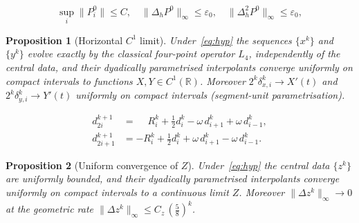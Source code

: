 \documentclass[10pt,a4paper]{amsart}
\newtheorem{proposition}{Proposition}
\newcommand{\Dh}{\Delta_h}
\newcommand{\Dhh}{\Delta_h^2}
\newcommand{\Lop}{L_4}
\newcommand{\R}{\mathbb{R}}
\newcommand{\norm}[1]{\lVert #1 \rVert}
\begin{document}
\begin{equation}\label{eq:hyp}
  \sup_i\norm{P_i^0}\leq C,\quad
  \norm{\Dh P^0}_\infty\leq\varepsilon_0,\quad
  \norm{\Dhh P^0}_\infty\leq\varepsilon_0,
\end{equation}

\begin{proposition}[Horizontal $C^1$ limit]\label{prop:horizontal}
Under~\eqref{eq:hyp} the sequences $\{x^k\}$ and $\{y^k\}$ evolve exactly by
the classical four-point operator $\Lop$, independently of the central data,
and their dyadically parametrised interpolants converge uniformly on compact
intervals to functions $X,Y\in C^1(\R)$. Moreover
$2^k\delta_{x,i}^k\to X'(t)$ and $2^k\delta_{y,i}^k\to Y'(t)$ uniformly on
compact intervals (segment-unit parametrisation).
\end{proposition}

\begin{align}
  d_{2i}^{k+1}   &= \phantom{-}R_i^k
    + \tfrac12 d_i^k - \omega\, d_{i+1}^k + \omega\, d_{i-1}^k,
    \label{eq:evengap}\\
  d_{2i+1}^{k+1} &= -R_i^k
    + \tfrac12 d_i^k + \omega\, d_{i+1}^k - \omega\, d_{i-1}^k.
    \label{eq:oddgap}
\end{align}

\begin{proposition}[Uniform convergence of $Z$]\label{prop:zconv}
Under~\eqref{eq:hyp} the central data $\{z^k\}$ are uniformly bounded, and their
dyadically parametrised interpolants converge uniformly on compact intervals to
a continuous limit $Z$. Moreover $\norm{\Delta z^k}_\infty\to0$ at the
geometric rate $\norm{\Delta z^k}_\infty\leq C_z\,(\tfrac58)^k$.
\end{proposition}
\end{document}
